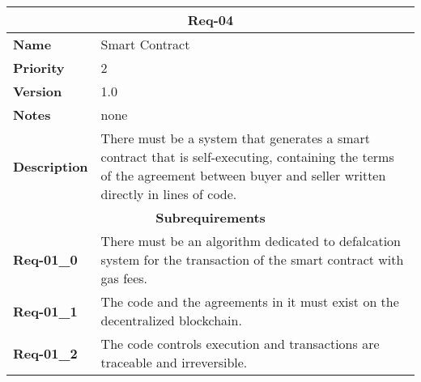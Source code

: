 \documentclass[../documentation.tex]{subfiles}
\begin{document}
\bgroup{}
\def\arraystretch{1.25}
\begin{center}
    \begin{tabular}{ |l|p{9cm}| }
        \hline
        \multicolumn{2}{|c|}{\textbf{Req-04}} \\
        \hline
        \textbf{Name} & Smart Contract \\
        \hline
        \textbf{Priority} & 2 \\
        \hline
        \textbf{Version} & 1.0 \\
        \hline
        \textbf{Notes} & none \\
        \hline
        \textbf{Description} & There must be a system that generates a smart contract that is self-executing, containing the terms of the agreement between buyer and seller written directly in lines of code. \\
        \hline
        \multicolumn{2}{|c|}{\textbf{Subrequirements}} \\
        \hline
        \textbf{Req-01\_0} & There must be an algorithm dedicated to defalcation system for the transaction of the smart contract with gas fees. \\
        \hline
        \textbf{Req-01\_1} & The code and the agreements in it must exist on the decentralized blockchain. \\
        \hline
        \textbf{Req-01\_2} & The code controls execution and transactions are traceable and irreversible. \\
        \hline
    \end{tabular}
\end{center}
\egroup{}
\end{document}
